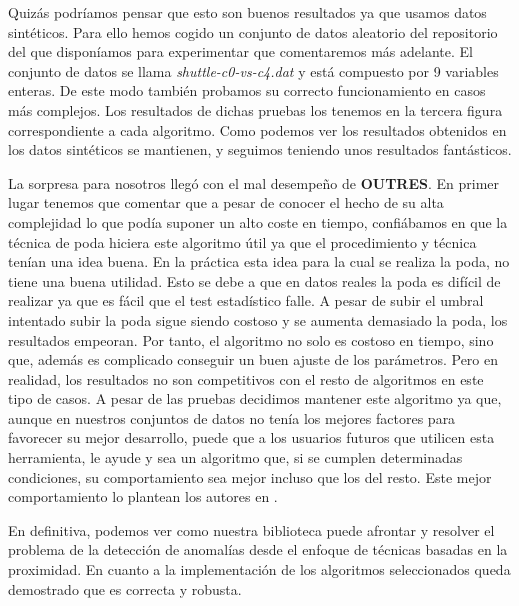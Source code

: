Quizás podríamos pensar que esto son buenos resultados ya que usamos datos 
sintéticos. Para ello hemos cogido un conjunto de datos aleatorio del repositorio del
que disponíamos para experimentar que comentaremos más adelante. El conjunto de
datos se llama \textit{shuttle-c0-vs-c4.dat} y está compuesto por 9 variables enteras.
De este modo también probamos su correcto funcionamiento en casos más complejos.
Los resultados de dichas pruebas los tenemos en la tercera figura correspondiente a cada
algoritmo. Como podemos ver los resultados obtenidos en los datos sintéticos se mantienen,
y seguimos teniendo unos resultados fantásticos.

La sorpresa para nosotros llegó con el mal desempeño de \textbf{OUTRES}. En primer lugar
tenemos que comentar que a pesar de conocer el hecho de su alta complejidad lo que podía
suponer un alto coste en tiempo, confiábamos en que la técnica de poda hiciera este algoritmo
útil ya que el procedimiento y técnica tenían una idea buena. En la práctica esta idea 
para la cual se realiza la poda, no tiene una buena utilidad. Esto se debe a que en datos 
reales la poda es difícil de realizar ya que es fácil que el test estadístico falle. A pesar de
subir el umbral intentado subir la poda sigue siendo costoso y se aumenta demasiado la poda, los
resultados empeoran. Por tanto, el algoritmo no solo es costoso en tiempo, sino que, además
es complicado conseguir un buen ajuste de los parámetros. Pero en realidad, los
resultados no son competitivos con el resto de algoritmos en este tipo de casos. A pesar de las pruebas
decidimos mantener este algoritmo ya que, aunque en nuestros conjuntos de datos no tenía los mejores factores 
para favorecer su mejor desarrollo, puede que a los usuarios futuros que utilicen
esta herramienta, le ayude y sea un algoritmo que, si se cumplen determinadas condiciones, su comportamiento
sea mejor incluso que los del resto. Este mejor comportamiento lo plantean los autores en 
\cite{mullerAdaptiveOutliernessSubspace2010}. 


En definitiva, podemos ver como nuestra biblioteca
puede afrontar y resolver el problema de la detección de anomalías
desde el enfoque de técnicas basadas en la proximidad. En cuanto a la implementación
de los algoritmos seleccionados queda demostrado que es correcta y robusta.




